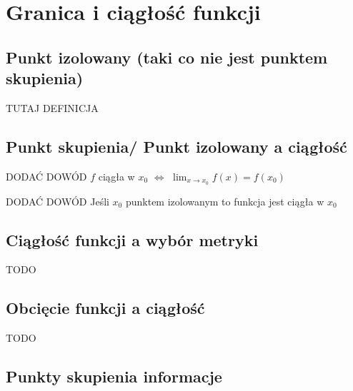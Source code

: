 \documentclass{article}
\begin{document}
\section{Granica i ciągłość funkcji}

\subsection{Punkt izolowany (taki co nie jest punktem skupienia)}

\begin{center}
    TUTAJ DEFINICJA
\end{center}

\subsection{Punkt skupienia/ Punkt izolowany a ciągłość}
\begin{center}
    DODAĆ DOWÓD \(f\) ciągła w \(x_0\) \(\iff\) \(\lim_{x \to x_0} f(x) = f(x_0)\)
\end{center}
\begin{center}
    DODAĆ DOWÓD Jeśli \(x_0\) punktem izolowanym to funkcja jest ciągła w \(x_0\)
\end{center}

\subsection{Ciągłość funkcji a wybór metryki}

\begin{center}
    TODO
\end{center}

\subsection{Obcięcie funkcji a ciągłość}

\begin{center}
    TODO
\end{center}

\subsection{Punkty skupienia informacje}
\end{document}
